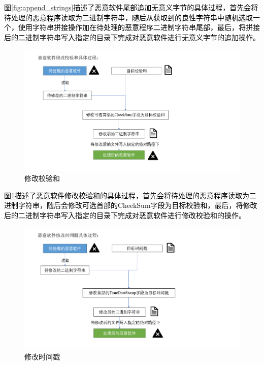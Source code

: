 \textcolor{black}{图\ref{fig:append_strings}描述了恶意软件尾部追加无意义字节的具体过程，首先会将待处理的恶意程序读取为二进制字符串，随后从获取到的良性字符串中随机选取一个，使用字符串拼接操作加在待处理的恶意程序二进制字符串尾部，最后，将拼接后的二进制字符串写入指定的目录下完成对恶意软件进行无意义字节的追加操作。}

\begin{figure}[htbp]
  \centering
  \includegraphics[]{images/modify_checksum.png}
  \caption{修改校验和}\label{fig:modify_checksum}
\end{figure}

\textcolor{black}{图\ref{fig:modify_checksum}描述了恶意软件修改校验和的具体过程，首先会将待处理的恶意程序读取为二进制字符串，随后会修改可选首部的CheckSum字段为目标校验和，最后，将修改后的二进制字符串写入指定的目录下完成对恶意软件进行修改校验和的操作。}

\begin{figure}[htbp]
  \centering
  \includegraphics[]{images/modify_timestamp.png}
  \caption{修改时间戳}\label{fig:modify_timestamp}
\end{figure}

